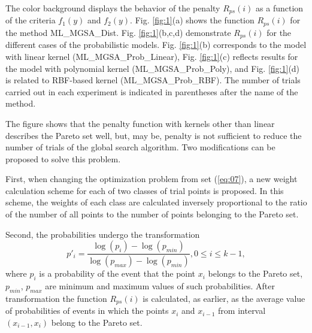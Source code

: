 \documentclass[runningheads]{llncs}
\begin{document}
The color background displays the behavior of the penalty $R_{ps}(i)$ as a function of the criteria $f_1(y)$ and $f_2(y)$. Fig. \ref{fig:1}(a) shows the function $R_{ps}(i)$ for the method ML\_MGSA\_Dist. Fig. \ref{fig:1}(b,c,d) demonstrate $R_{ps}(i)$ for the different cases of the probabilistic models. Fig. \ref{fig:1}(b) corresponds to the model with linear kernel (ML\_MGSA\_Prob\_Linear), Fig. \ref{fig:1}(c) reflects results for the model with polynomial kernel (ML\_MGSA\_Prob\_Poly), and Fig. \ref{fig:1}(d) is related to RBF-based kernel (ML\_MGSA\_Prob\_RBF).
The number of trials carried out in each experiment is indicated in parentheses after the name of the method.

The figure shows that the penalty function with kernels other than linear describes the Pareto set well, but, may be, penalty is not sufficient to reduce the number of trials of the global search algorithm. Two modifications can be proposed to solve this problem.

First, when changing the optimization problem from set (\ref{eq:07}), a new weight calculation scheme for each of two classes of trial points is proposed. In this scheme, the weights of each class are calculated inversely proportional to the ratio of the number of all points to the number of points belonging to the Pareto set.

Second, the probabilities undergo the transformation
\begin{equation}
    \label{eq:18}
p'_i= \frac{ \log (p_i) - \log (p_{min})}{ \log (p_{max}) - \log (p_{min})} , 0 \leq i \leq k-1,
\end{equation}
where $p_i$ is a probability of the event that the point $x_i$ belongs to the Pareto set, $p_{min}$, $p_{max}$ are minimum and maximum values of such probabilities. After transformation the function $R_{ps}(i)$ is calculated, as earlier, as the average value of probabilities of events in which the points $x_i$ and $x_{i-1}$ from interval $(x_{i-1}, x_i)$ belong to the Pareto set.
\end{document}
